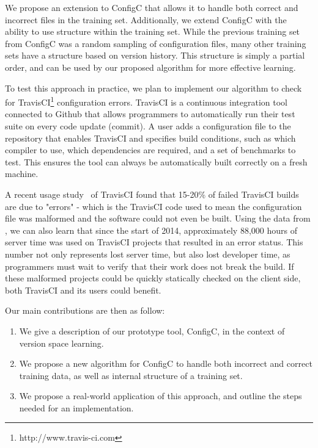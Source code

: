 We propose an extension to ConfigC that allows it to handle both correct and incorrect files in the training set.
Additionally, we extend ConfigC with the ability to use structure within the training set.
While the previous training set from ConfigC was a random sampling of configuration files, many other training sets have a structure based on version history.
This structure is simply a partial order, and can be used by our proposed algorithm for more effective learning.

To test this approach in practice, we plan to implement our algorithm to check for TravisCI\footnote{http://www.travis-ci.com} configuration errors.
TravisCI is a continuous integration tool connected to Github that allows programmers to automatically run their test suite on every code update (commit).
A user adds a configuration file to the repository that enables TravisCI and specifies build conditions, such as which compiler to use, which dependencies are required, and a set of benchmarks to test.
This ensures the tool can always be automatically built correctly on a fresh machine.

A recent usage study~\cite{API} of TravisCI found that 15-20\% of failed TravisCI builds are due to "errors" - which is the TravisCI code used to mean the configuration file was malformed and the software could not even be built.
Using the data from \cite{API}, we can also learn that since the start of 2014, approximately 88,000 hours of server time was used on TravisCI projects that resulted in an error status.
This number not only represents lost server time, but also lost developer time, as programmers must wait to verify that their work does not break the build.
If these malformed projects could be quickly statically checked on the client side, both TravisCI and its users could benefit.

Our main contributions are then as follow:

\begin{enumerate}

\item We give a description of our prototype tool, ConfigC, in the context of version space learning.
\item We propose a new algorithm for ConfigC to handle both incorrect and correct training data, as well as internal structure of a training set.
\item We propose a real-world application of this approach, and outline the steps needed for an implementation.

\end{enumerate} 
